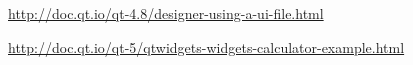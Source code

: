 \begin{thebibliography}{99999}
\singlespace\normalsize

 \url{http://doc.qt.io/qt-4.8/designer-using-a-ui-file.html}


 \url{http://doc.qt.io/qt-5/qtwidgets-widgets-calculator-example.html}


\end{thebibliography}